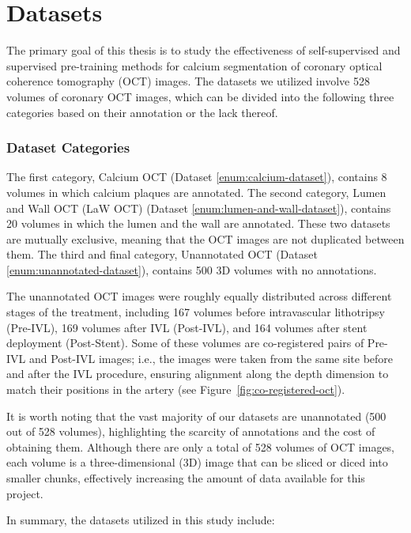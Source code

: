 \documentclass[a4paper,11pt,oneside]{report}
\begin{document}

\section{Datasets}\label{sec:design:datasets}
The primary goal of this thesis is to study the effectiveness of self-supervised and supervised pre-training methods for calcium segmentation of coronary optical coherence tomography (OCT) images. The datasets we utilized involve 528 volumes of coronary OCT images, which can be divided into the following three categories based on their annotation or the lack thereof. 

\subsubsection{Dataset Categories}

The first category, Calcium OCT (Dataset \ref{enum:calcium-dataset}), contains 8 volumes in which calcium plaques are annotated. The second category, Lumen and Wall OCT (LaW OCT) (Dataset \ref{enum:lumen-and-wall-dataset}), contains 20 volumes in which the lumen and the wall are annotated. These two datasets are mutually exclusive, meaning that the OCT images are not duplicated between them. The third and final category, Unannotated OCT (Dataset \ref{enum:unannotated-dataset}), contains 500 3D volumes with no annotations. 

The unannotated OCT images were roughly equally distributed across different stages of the treatment, including 167 volumes before intravascular lithotripsy (Pre-IVL), 169 volumes after IVL (Post-IVL), and 164 volumes after stent deployment (Post-Stent). Some of these volumes are co-registered pairs of Pre-IVL and Post-IVL images; i.e., the images were taken from the same site before and after the IVL procedure, ensuring alignment along the depth dimension to match their positions in the artery (see Figure~\ref{fig:co-registered-oct}). 

It is worth noting that the vast majority of our datasets are unannotated (500 out of 528 volumes), highlighting the scarcity of annotations and the cost of obtaining them. Although there are only a total of 528 volumes of OCT images, each volume is a three-dimensional (3D) image that can be sliced or diced into smaller chunks, effectively increasing the amount of data available for this project. 

In summary, the datasets utilized in this study include:
\end{document}
